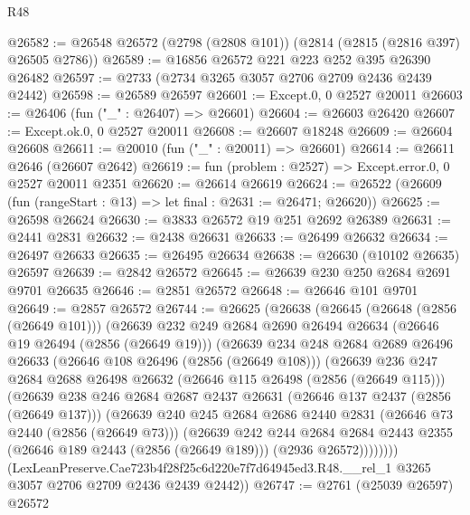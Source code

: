 \begin{lexlean}{R48}
\begin{coremodule}
@26582 := @26548 @26572 (@2798 (@2808 @101)) (@2814 (@2815 (@2816 @397) @26505 @2786))
@26589 := @16856 @26572 @221 @223 @252 @395 @26390 @26482
@26597 := @2733 (@2734 @3265 @3057 @2706 @2709 @2436 @2439 @2442)
@26598 := @26589 @26597
@26601 := Except.{0, 0} @2527 @20011
@26603 := @26406 (fun ("_" : @26407) => @26601)
@26604 := @26603 @26420
@26607 := Except.ok.{0, 0} @2527 @20011
@26608 := @26607 @18248
@26609 := @26604 @26608
@26611 := @20010 (fun ("_" : @20011) => @26601)
@26614 := @26611 @2646 (@26607 @2642)
@26619 := fun (problem : @2527) => Except.error.{0, 0} @2527 @20011 @2351
@26620 := @26614 @26619
@26624 := @26522 (@26609 (fun (rangeStart : @13) => let final : @2631 := @26471; @26620))
@26625 := @26598 @26624
@26630 := @3833 @26572 @19 @251 @2692 @26389
@26631 := @2441 @2831
@26632 := @2438 @26631
@26633 := @26499 @26632
@26634 := @26497 @26633
@26635 := @26495 @26634
@26638 := @26630 (@10102 @26635) @26597
@26639 := @2842 @26572
@26645 := @26639 @230 @250 @2684 @2691 @9701 @26635
@26646 := @2851 @26572
@26648 := @26646 @101 @9701
@26649 := @2857 @26572
@26744 := @26625
    (@26638
      (@26645
        (@26648 (@2856 (@26649 @101)))
        (@26639
          @232
          @249
          @2684
          @2690
          @26494
          @26634
          (@26646 @19 @26494 (@2856 (@26649 @19)))
          (@26639
            @234
            @248
            @2684
            @2689
            @26496
            @26633
            (@26646 @108 @26496 (@2856 (@26649 @108)))
            (@26639
              @236
              @247
              @2684
              @2688
              @26498
              @26632
              (@26646 @115 @26498 (@2856 (@26649 @115)))
              (@26639
                @238
                @246
                @2684
                @2687
                @2437
                @26631
                (@26646 @137 @2437 (@2856 (@26649 @137)))
                (@26639
                  @240
                  @245
                  @2684
                  @2686
                  @2440
                  @2831
                  (@26646 @73 @2440 (@2856 (@26649 @73)))
                  (@26639
                    @242
                    @244
                    @2684
                    @2684
                    @2443
                    @2355
                    (@26646 @189 @2443 (@2856 (@26649 @189)))
                    (@2936 @26572))))))))
      (LexLeanPreserve.Cae723b4f28f25c6d220e7f7d64945ed3.R48.__rel_1
        @3265
        @3057
        @2706
        @2709
        @2436
        @2439
        @2442))
@26747 := @2761 (@25039 @26597) @26572

\end{coremodule}
\end{lexlean}
